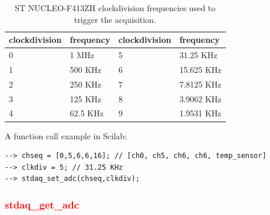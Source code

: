 \documentclass[letterpaper,10pt,english]{hitec}
\begin{document}
\begin{table}[h]
\caption{ST NUCLEO-F413ZH clockdivision frequencies used to trigger the acquisition.}
\centering
\begin{tabular}{|ll|ll|}
 clockdivision & frequency & clockdivision & frequency \\ \hline
 0 & 1 MHz & 5 & 31.25 KHz \\
 1 & 500 KHz & 6 & 15.625 KHz \\
 2 & 250 KHz & 7 & 7.8125 KHz \\
 3 & 125 KHz & 8 & 3.9062 KHz \\
 4 & 62.5 KHz & 9 & 1.9531 KHz \\
\end{tabular}
\end{table}
A function call example in Scilab:
\begin{verbatim}
--> chseq = [0,5,6,6,16]; // [ch0, ch5, ch6, ch6, temp_sensor]
--> clkdiv = 5; // 31.25 KHz
--> stdaq_set_adc(chseq,clkdiv);
\end{verbatim}


\subsubsection{\textcolor{red}{stdaq\_get\_adc}}
\end{document}
